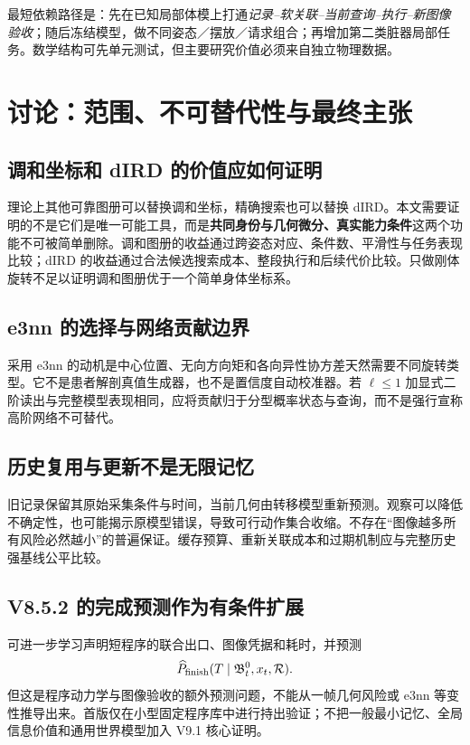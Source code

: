 \documentclass[UTF8,fontset=fandol,11pt,a4paper]{ctexart}
\theoremstyle{plain}
\theoremstyle{definition}
\theoremstyle{remark}
\numberwithin{equation}{section}
\newcommand{\B}{\mathfrak B}
\newcommand{\cR}{\mathcal R}
\begin{document}
最短依赖路径是：先在已知局部体模上打通\emph{记录--软关联--当前查询--执行--新图像验收}；随后冻结模型，做不同姿态／摆放／请求组合；再增加第二类脏器局部任务。数学结构可先单元测试，但主要研究价值必须来自独立物理数据。

\section{讨论：范围、不可替代性与最终主张}
\label{sec:discussion}
\subsection{调和坐标和 dIRD 的价值应如何证明}
理论上其他可靠图册可以替换调和坐标，精确搜索也可以替换 dIRD。本文需要证明的不是它们是唯一可能工具，而是\textbf{共同身份与几何微分、真实能力条件}这两个功能不可被简单删除。调和图册的收益通过跨姿态对应、条件数、平滑性与任务表现比较；dIRD 的收益通过合法候选搜索成本、整段执行和后续代价比较。只做刚体旋转不足以证明调和图册优于一个简单身体坐标系。

\subsection{e3nn 的选择与网络贡献边界}
采用 e3nn 的动机是中心位置、无向方向矩和各向异性协方差天然需要不同旋转类型。它不是患者解剖真值生成器，也不是置信度自动校准器。若 $\ell\le1$ 加显式二阶读出与完整模型表现相同，应将贡献归于分型概率状态与查询，而不是强行宣称高阶网络不可替代。

\subsection{历史复用与更新不是无限记忆}
旧记录保留其原始采集条件与时间，当前几何由转移模型重新预测。观察可以降低不确定性，也可能揭示原模型错误，导致可行动作集合收缩。不存在“图像越多所有风险必然越小”的普遍保证。缓存预算、重新关联成本和过期机制应与完整历史强基线公平比较。

\subsection{V8.5.2 的完成预测作为有条件扩展}
可进一步学习声明短程序的联合出口、图像凭据和耗时，并预测
\begin{equation}
 \widehat P_{\rm finish}(T\mid\B_t^0,x_t,\cR).
\end{equation}
但这是程序动力学与图像验收的额外预测问题，不能从一帧几何风险或 e3nn 等变性推导出来。首版仅在小型固定程序库中进行持出验证；不把一般最小记忆、全局信息价值和通用世界模型加入 V9.1 核心证明。
\end{document}
